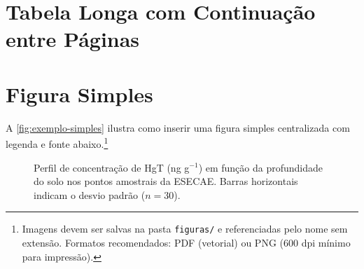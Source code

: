 \section{Tabela Longa com Continuação entre Páginas}

%

\section{Figura Simples}

A \autoref{fig:exemplo-simples} ilustra como inserir uma figura
simples centralizada com legenda e fonte abaixo.\footnote{Imagens
devem ser salvas na pasta \texttt{figuras/} e referenciadas pelo
nome sem extensão. Formatos recomendados: PDF (vetorial) ou PNG
(600 dpi mínimo para impressão).}

\begin{figure}[htb]
  \centering
  \fbox{\rule{0pt}{5cm}\rule{0.7\textwidth}{0pt}}
  \caption{Perfil de concentração de HgT (ng g$^{-1}$) em função da
           profundidade do solo nos pontos amostrais da ESECAE.
           Barras horizontais indicam o desvio padrão ($n = 30$).}
  \label{fig:exemplo-simples}
\end{figure}

